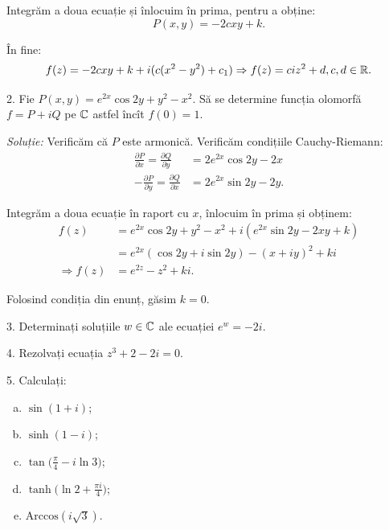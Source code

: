 Integrăm a doua ecuație și înlocuim în prima, pentru a obține:
\[
  P(x, y) = -2cxy + k.
\]

În fine:
\[
  f(z) = -2cxy + k + i(c(x^2 - y^2) + c_1) \Rightarrow f(z) = ciz^2 + d, c, d \in \mathbb{R}.
\]

\vspace{1cm}

2. Fie $ P(x, y) = e^{2x} \cos 2y + y^2 - x^2 $. Să se determine funcția
olomorfă $ f = P + iQ $ pe $ \mathbb{C} $ astfel încît $ f(0) = 1 $.

\emph{Soluție:} Verificăm că $ P $ este armonică. Verificăm condițiile
Cauchy-Riemann:
\begin{align*}
  \frac{\partial P}{\partial x} = \frac{\partial Q}{\partial y} &= 2e^{2x} \cos 2y - 2x \\
  -\frac{\partial P}{\partial y} = \frac{\partial Q}{\partial x} &= 2e^{2x} \sin 2y - 2y.
\end{align*}

Integrăm a doua ecuație în raport cu $ x $, înlocuim în prima și obținem:
\begin{align*}
  f(z) &= e^{2x} \cos 2y + y^2 - x^2 + i(e^{2x}\sin 2y - 2xy + k) \\
       &= e^{2x}(\cos 2y + i\sin 2y) - (x + iy)^2 + ki \\
  \Rightarrow f(z) &= e^{2z} - z^2 + ki.
\end{align*}

Folosind condiția din enunț, găsim $ k = 0 $.

\vspace{1cm}

3. Determinați soluțiile $ w \in \mathbb{C} $ ale ecuației $ e^w = -2i $.

\vspace{1cm}

4. Rezolvați ecuația $ z^3 + 2 - 2i = 0 $.

\vspace{1cm}

5. Calculați:
\begin{enumerate}[(a)]
\item $ \sin(1 + i) $;
\item $ \sinh(1 - i) $;
\item $ \tan\big( \frac{\pi}{4} - i\ln 3 \big) $;
\item $ \tanh \big(\ln 2 + \frac{\pi i}{4}\big) $;
\item $ \mathrm{Arccos}(i \sqrt{3}) $.
\end{enumerate}

\vspace{1cm}

